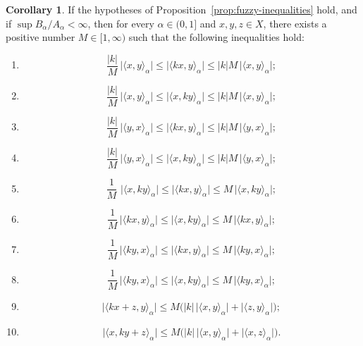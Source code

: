 \documentclass[preprint,12pt]{elsarticle}
\theoremstyle{definition}
\newtheorem{corollary}[theorem]{Corollary}
\begin{document}
\begin{corollary}
	If the hypotheses of Proposition~\ref{prop:fuzzy-inequalities} hold, and if $\sup B_\alpha / A_\alpha < \infty$, then for every $\alpha \in (0,1]$ and $x, y, z \in X$, there exists a positive number $M \in [1, \infty)$ such that the following inequalities hold:
	
	
	\begin{enumerate}
		\item 
	\[
	\frac{|k| }{M} \, \big|\langle x, y \rangle_\alpha \big|
	\leq 
	\big|\langle k x, y \rangle_\alpha \big|
	\leq 
		|k|M \, \big|\langle x, y \rangle_\alpha \big|;
	\]
	
	\item 
	\[
\frac{|k| }{M} \, \big|\langle x, y \rangle_\alpha \big|
	\leq 
	\big|\langle x, k y \rangle_\alpha \big|
	\leq 
		|k|M \, \big|\langle x, y \rangle_\alpha \big|;
	\]
	
	\item 
	\[
\frac{|k| }{M} \, \big|\langle y, x \rangle_\alpha \big|
	\leq 
	\big|\langle k x, y \rangle_\alpha \big|
	\leq 
		|k|M \, \big|\langle y, x \rangle_\alpha \big|;
	\]
	
	\item 
	\[
\frac{|k| }{M} \, \big|\langle y, x \rangle_\alpha \big|
	\leq 
	\big|\langle x, k y \rangle_\alpha \big|
	\leq 
	|k|M \, \big|\langle y, x \rangle_\alpha \big|;
	\]
	
	\item 
	\[
	\frac{1 }{M} \, \, \big|\langle x, k y \rangle_\alpha \big|
	\leq 
	\big|\langle k x, y \rangle_\alpha \big|
	\leq 
	M \, \big|\langle x, k y \rangle_\alpha \big|;
	\]
	
	\item 
	\[
	\frac{1 }{M} \, \big|\langle k x, y \rangle_\alpha \big|
	\leq 
	\big|\langle x, k y \rangle_\alpha \big|
	\leq 
M \, \big|\langle k x, y \rangle_\alpha \big|;
	\]
	
	\item 
	\[
	\frac{1 }{M} \, \big|\langle k y, x \rangle_\alpha \big|
	\leq 
	\big|\langle k x, y \rangle_\alpha \big|
	\leq 
	M \, \big|\langle k y, x \rangle_\alpha \big|;
	\]
	
	\item 
	\[
		\frac{1 }{M} \, \big|\langle k y, x \rangle_\alpha \big|
	\leq 
	\big|\langle x,  k y \rangle_\alpha \big|
	\leq 
	M \, \big|\langle k y, x \rangle_\alpha \big|;
	\]
	
	\item 
	\[
	\big|\langle k x + z, y \rangle_\alpha \big|
	\leq 
	M \Big( |k| \, \big|\langle x, y \rangle_\alpha \big| + \big|\langle z, y \rangle_\alpha \big| \Big);
	\]
	
	\item 
	\[
	\big|\langle x, k y + z \rangle_\alpha \big|
	\leq 
M \Big( |k| \, \big|\langle x, y \rangle_\alpha \big| + \big|\langle x, z \rangle_\alpha \big| \Big).
	\]
	\end{enumerate}
\end{corollary}
\end{document}

